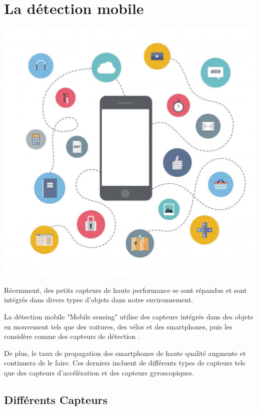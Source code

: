 
\chapter{La détection mobile}

\label{chapitre2}
		
		\includegraphics [width=1 \linewidth, height=0.8\textheight, keepaspectratio] {Images/chapterFigures/chTwo.png}
		
	
		
		\newpage

Récemment, des petits capteurs de haute performance se sont répandus et sont intégrés dans divers types d'objets dans notre environnement.

La détection mobile "Mobile sensing" utilise des capteurs intégrés dans des objets en mouvement tels que des voitures, des vélos et des smartphones, puis les considère comme des capteurs de détection \cite{nomuraMethodEstimatingRoad2015}.

De plus, le taux de propagation des smartphones de haute qualité augmente et continuera de le faire. Ces derniers incluent de différents types de capteurs tels que des capteurs d'accélération et des capteurs gyroscopiques.



\section{Différents Capteurs}

